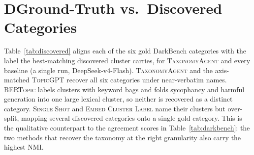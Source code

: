 \section*{D\quad Ground-Truth vs.\ Discovered Categories}
\label{app:discovered}

Table~\ref{tab:discovered} aligns each of the six gold DarkBench
categories with the label the best-matching discovered cluster carries,
for \textsc{TaxonomyAgent} and every baseline (a single run,
DeepSeek-v4-Flash). \textsc{TaxonomyAgent} and the axis-matched
\textsc{TopicGPT} recover all six categories under near-verbatim names.
\textsc{BERTopic} labels clusters with keyword bags and folds sycophancy
and harmful generation into one large lexical cluster, so neither is
recovered as a distinct category. \textsc{Single Shot} and
\textsc{Embed Cluster Label} name their clusters but over-split, mapping
several discovered categories onto a single gold category. This is the
qualitative counterpart to the agreement scores in
Table~\ref{tab:darkbench}: the two methods that recover the taxonomy at
the right granularity also carry the highest NMI.

